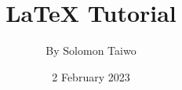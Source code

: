 \documentclass[a4paper,12pt]{book}
\begin{document}
\title{\Large{\textbf{LaTeX Tutorial}}}
\author{By Solomon Taiwo}
\date{2 February 2023}

\maketitle
\tableofcontents


\blindtext[5]
\end{document}
